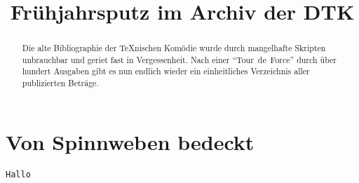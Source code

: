 \documentclass[ngerman]{dtk}
\title{Frühjahrsputz im Archiv der DTK}
\begin{document}
\maketitle

\begin{abstract}
Die alte Bibliographie der \TeX{}nischen Komödie wurde durch mangelhafte Skripten unbrauchbar und geriet fast in Vergessenheit.
Nach einer \enquote{Tour~de~Force} durch über hundert Ausgaben gibt es nun endlich wieder ein einheitliches Verzeichnis aller publizierten Beträge.
\end{abstract} 

\section{Von Spinnweben bedeckt}

\nocite{*}

\begin{lstlisting}
Hallo
\end{lstlisting}


\printbibliography
\end{document}
